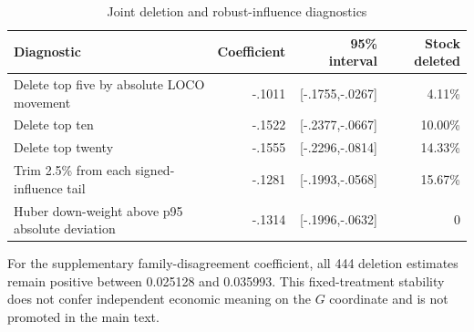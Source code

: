 \begin{table}[htbp]
\centering
\caption{Joint deletion and robust-influence diagnostics}\label{tab:appjointloco}
\small
\begin{tabularx}{\textwidth}{Yrrr}
\toprule
Diagnostic & Coefficient & 95\% interval & Stock deleted \\
\midrule
Delete top five by absolute LOCO movement & -.1011 & [-.1755,-.0267] & 4.11\% \\
Delete top ten & -.1522 & [-.2377,-.0667] & 10.00\% \\
Delete top twenty & -.1555 & [-.2296,-.0814] & 14.33\% \\
Trim 2.5\% from each signed-influence tail & -.1281 & [-.1993,-.0568] & 15.67\% \\
Huber down-weight above p95 absolute deviation & -.1314 & [-.1996,-.0632] & 0 \\
\bottomrule
\end{tabularx}
\end{table}

\enlargethispage{2\baselineskip}
For the supplementary family-disagreement coefficient, all 444 deletion estimates remain positive between 0.025128 and 0.035993. This fixed-treatment stability does not confer independent economic meaning on the $G$ coordinate and is not promoted in the main text.
\FloatBarrier
